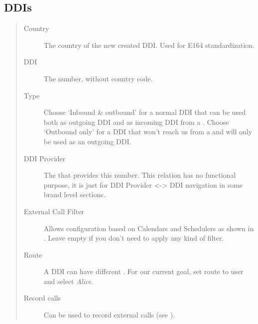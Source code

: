 \documentclass[letterpaper,10pt,spanish]{sphinxmanual}
\begin{document}
\subsection{DDIs}
\label{administration_portal/client/vpbx/ddis:ddis}\label{administration_portal/client/vpbx/ddis::doc}\label{administration_portal/client/vpbx/ddis:pbx-ddis}\begin{quote}
\begin{description}
\item[{Country}] \leavevmode
The country of the new created DDI. Used for E164 standardization.

\item[{DDI}] \leavevmode
The number, without country code.

\item[{Type}] \leavevmode
Choose `Inbound \& outbound' for a normal DDI that can be used both as outgoing DDI and as incoming DDI
from a {\hyperref[administration_portal/brand/providers/ddi_providers:ddi\string-providers]{}}. Choose `Outbound only' for a DDI that won't reach us from a
{\hyperref[administration_portal/brand/providers/ddi_providers:ddi\string-providers]{}} and will only be used as an outgoing DDI.

\item[{DDI Provider}] \leavevmode
The {\hyperref[administration_portal/brand/providers/ddi_providers:ddi\string-providers]{}} that provides this number. This relation has no functional purpose, it
is just for DDI Provider \textless{}-\textgreater{} DDI navigation in some brand level sections.

\item[{External Call Filter}] \leavevmode
Allows configuration based on Calendars and Schedulers as shown in
{\hyperref[administration_portal/client/vpbx/routing_tools/external_call_filters:external\string-call\string-filters]{}}. Leave empty if you don't need to apply any
kind of filter.

\item[{Route}] \leavevmode
A DDI can have different {\hyperref[administration_portal/client/vpbx/ddis:routing\string-logics]{}}. For our
current goal, set route to user and select \emph{Alice}.

\item[{Record calls}] \leavevmode
Can be used to record external calls (see {\hyperref[administration_portal/client/vpbx/calls/call_recordings:call\string-recordings]{}}).


\end{description}
\end{quote}
\end{document}
